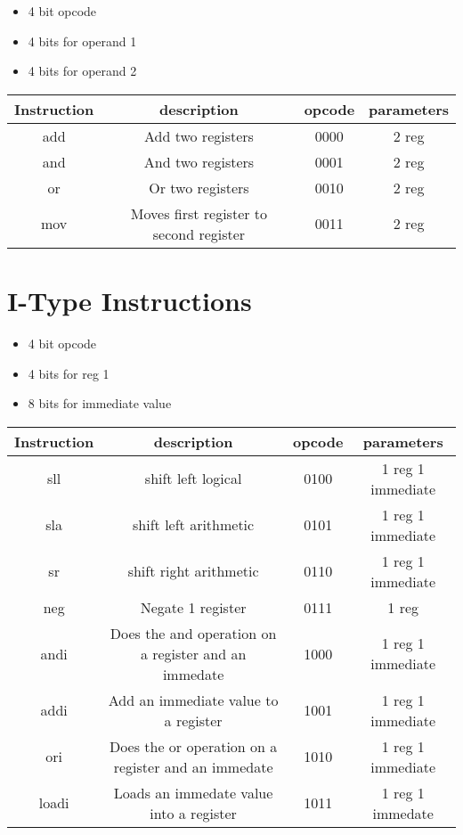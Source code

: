 \documentclass[a4paper]{article}
\begin{document}
\begin{itemize}
\item 4 bit opcode
\item 4 bits for operand 1
\item 4 bits for operand 2
\end{itemize}



\begin{center}
\begin{tabular}{| c | c | c | c |}
\hline
Instruction & description & opcode & parameters \\ \hline
add & Add two registers & 0000 & 2 reg \\ \hline
and & And two registers & 0001 & 2 reg \\ \hline
or & Or two registers & 0010 & 2 reg \\ \hline
mov & Moves first register to second register & 0011 & 2 reg \\ \hline
\end{tabular}
\end{center}

\section{I-Type Instructions}
\begin{itemize}
\item 4 bit opcode
\item 4 bits for reg 1
\item 8 bits for immediate value
\end{itemize}

\begin{center}
\begin{tabular}{| c | c | c | c |}
\hline
Instruction & description & opcode & parameters \\ \hline
sll & shift left logical & 0100 & 1 reg 1 immediate \\ \hline
sla & shift left arithmetic & 0101 & 1 reg 1 immediate \\ \hline
sr & shift right arithmetic & 0110 & 1 reg 1 immediate \\ \hline
neg & Negate 1 register & 0111 & 1 reg \\ \hline
andi & Does the and operation on a register and an immedate & 1000 & 1 reg 1 immediate \\ \hline
addi & Add an immediate value to a register & 1001 & 1 reg 1 immediate \\ \hline
ori & Does the or operation on a register and an immedate & 1010 & 1 reg 1 immediate \\ \hline
loadi & Loads an immedate value into a register & 1011 & 1 reg 1 immedate \\ \hline
\end{tabular}
\end{center}
\end{document}
